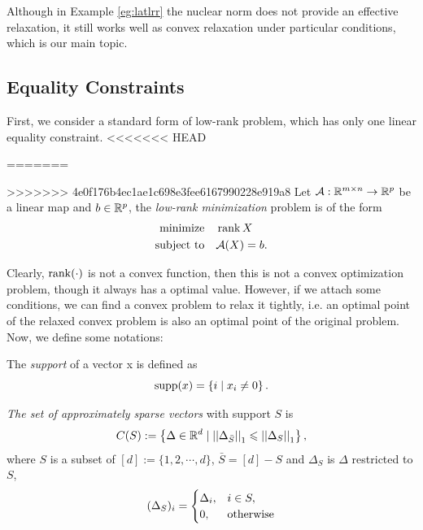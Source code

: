 \documentclass[11pt]{article}
\begin{document}
Although in Example \ref{eg:latlrr} the nuclear norm does not provide an effective relaxation, it still works well as convex relaxation under particular conditions, which is our main topic.

\subsection{Equality Constraints}

First, we consider a standard form of low-rank problem, which has only one linear equality constraint.
<<<<<<< HEAD
\begin{problem}\label{p:lr}
=======
\begin{definition}
>>>>>>> 4e0f176b4ec1ae1c698e3fee6167990228e919a8
    Let \(\mathcal{A}:\mathbb R^{m\times n}\to \mathbb R^p\) be a linear map and \(b\in \mathbb R^p\), the \emph{low-rank minimization} problem is of the form 
    \[\begin{aligned}
        \textnormal{minimize}\quad & \operatorname{rank} X\\
        \textnormal{subject to}\quad & \mathcal A(X)=b.
    \end{aligned}\]
\end{definition}

Clearly, \(\operatorname{rank}(\cdot)\) is not a convex function, then this is not a convex optimization problem, though it always has a optimal value. However, if we attach some conditions, we can find a convex problem to relax it tightly, i.e. an optimal point of the relaxed convex problem is also an optimal point of the original problem. Now, we define some notations:

\begin{definition}[Support]
    The \emph{support} of a vector x is defined as
    \[\operatorname{supp}(x) = \left\{i \mid x_i \neq 0\right\}.\]
\end{definition}

\begin{definition}
    \emph{The set of approximately sparse vectors} with support \(S\) is 
    \[C(S):=\left\{\Delta \in \mathbb R^d \mid \left|\left|\Delta_{\bar{S}}\right|\right|_1\leqslant \left|\left|\Delta_S\right|\right|_1\right\},\]
    where \(S\) is a subset of \([d]:=\{1,2,\cdots,d\}\), \(\bar{S}=[d]-S\) and \(\Delta_S\) is \(\Delta\) restricted to \(S\),
    \[(\Delta_S)_i = \begin{cases}
        \Delta_i, & i \in S,\\
        0, & \textnormal{otherwise}
    \end{cases}\]
\end{definition}


\end{problem}
\end{document}
